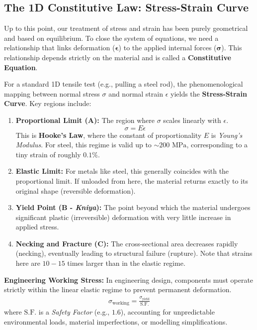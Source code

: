 \subsection*{The 1D Constitutive Law: Stress-Strain Curve}

Up to this point, our treatment of stress and strain has been purely geometrical and based on equilibrium. To close the system of equations, we need a relationship that links deformation ($\boldsymbol{\epsilon}$) to the applied internal forces ($\mathbf{\sigma}$). This relationship depends strictly on the material and is called a \textbf{Constitutive Equation}.

For a standard 1D tensile test (e.g., pulling a steel rod), the phenomenological mapping between normal stress $\sigma$ and normal strain $\epsilon$ yields the \textbf{Stress-Strain Curve}. Key regions include:

\begin{enumerate}
    \item \textbf{Proportional Limit (A):} The region where $\sigma$ scales linearly with $\epsilon$.
    \begin{equation}
        \boxed{\sigma = E \epsilon}
    \end{equation}
    This is \textbf{Hooke's Law}, where the constant of proportionality $E$ is \textit{Young's Modulus}. For steel, this regime is valid up to $\sim 200 \text{ MPa}$, corresponding to a tiny strain of roughly $0.1\%$.
    \item \textbf{Elastic Limit:} For metals like steel, this generally coincides with the proportional limit. If unloaded from here, the material returns exactly to its original shape (reversible deformation).
    \item \textbf{Yield Point (B - \textit{Kniya}):} The point beyond which the material undergoes significant plastic (irreversible) deformation with very little increase in applied stress.
    \item \textbf{Necking and Fracture (C):} The cross-sectional area decreases rapidly (necking), eventually leading to structural failure (rupture). Note that strains here are $10-15$ times larger than in the elastic regime.
\end{enumerate}

\textbf{Engineering Working Stress:} In engineering design, components must operate strictly within the linear elastic regime to prevent permanent deformation. 
\begin{align}
    \sigma_{\text{working}} = \frac{\sigma_{\text{yield}}}{\text{S.F.}}
\end{align}
where $\text{S.F.}$ is a \textit{Safety Factor} (e.g., $1.6$), accounting for unpredictable environmental loads, material imperfections, or modelling simplifications.

